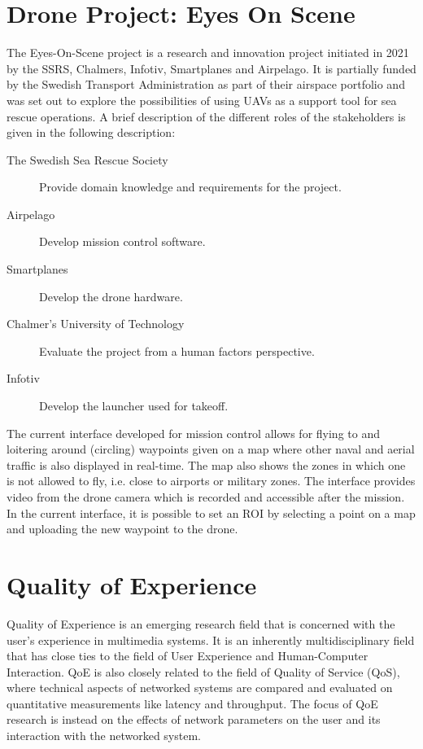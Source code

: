 \documentclass[nofilelist]{cslthse-msc}
\begin{document}
\section{Drone Project: Eyes On Scene}
The Eyes-On-Scene project is a research and innovation project initiated in 2021 by the SSRS, Chalmers, Infotiv, Smartplanes and Airpelago. It is partially funded by the Swedish Transport Administration as part of their airspace portfolio and was set out to explore the possibilities of using UAVs as a support tool for sea rescue operations. A brief description of the different roles of the stakeholders is given in the following description:

\begin{description}
   \item[The Swedish Sea Rescue Society] Provide domain knowledge and requirements for the project. 
   \item[Airpelago] Develop mission control software.
   \item[Smartplanes] Develop the drone hardware.
   \item[Chalmer's University of Technology] Evaluate the project from a human factors perspective.
   \item[Infotiv] Develop the launcher used for takeoff.
\end{description}

The current interface developed for mission control allows for flying to and loitering around (circling) waypoints given on a map where other naval and aerial traffic is also displayed in real-time. The map also shows the zones in which one is not allowed to fly, i.e. close to airports or military zones. The interface provides video from the drone camera which is recorded and accessible after the mission. In the current interface, it is possible to set an ROI by selecting a point on a map and uploading the new waypoint to the drone.

\section{Quality of Experience}
Quality of Experience is an emerging research field that is concerned with the user's experience in multimedia systems. It is an inherently multidisciplinary field that has close ties to the field of User Experience and Human-Computer Interaction. QoE is also closely related to the field of Quality of Service (QoS), where technical aspects of networked systems are compared and evaluated on quantitative measurements like latency and throughput. The focus of QoE research is instead on the effects of network parameters on the user and its interaction with the networked system.
\end{document}
